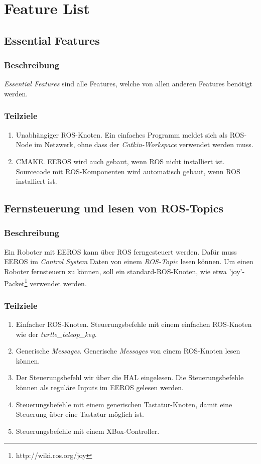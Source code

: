 
\chapter{Feature List}


\section{Essential Features}
\subsection{Beschreibung}
\textit{Essential Features} sind alle Features, welche von allen anderen Features benötigt werden.

\subsection{Teilziele}
\begin{enumerate}
\item Unabhängiger ROS-Knoten. Ein einfaches Programm meldet sich als ROS-Node im Netzwerk, ohne dass der \textit{Catkin-Workspace} verwendet werden muss.
\item CMAKE. EEROS wird auch gebaut, wenn ROS nicht installiert ist. Sourcecode mit ROS-Komponenten wird automatisch gebaut, wenn ROS installiert ist.
\end{enumerate}


\section{Fernsteuerung und lesen von ROS-Topics}
\subsection{Beschreibung}
Ein Roboter mit EEROS kann über ROS ferngesteuert werden.
Dafür muss EEROS im \textit{Control System} Daten von einem \textit{ROS-Topic} lesen können.
Um einen Roboter fernsteuern zu können, soll ein standard-ROS-Knoten, wie etwa 'joy'-Packet\footnote{http://wiki.ros.org/joy} verwendet werden.

\subsection{Teilziele}
\begin{enumerate}
\item Einfacher ROS-Knoten. Steuerungsbefehle mit einem einfachen ROS-Knoten wie der \textit{turtle\_teleop\_key}.
\item Generische \textit{Messages}. Generische \textit{Messages} von einem ROS-Knoten lesen können.
\item Der Steuerungsbefehl wir über die HAL eingelesen. Die Steuerungsbefehle können als reguläre Inputs im EEROS gelesen werden.
\item Steuerungsbefehle mit einem generischen Tastatur-Knoten, damit eine Steuerung über eine Tastatur möglich ist.
\item Steuerungsbefehle mit einem XBox-Controller.
\end{enumerate}


